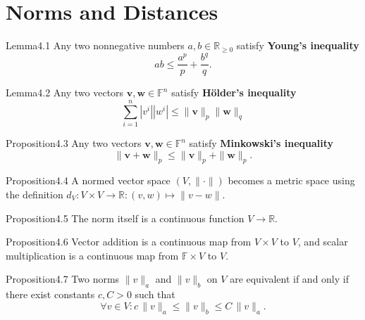 \section{Norms and Distances}

\begin{res}{Lemma}{4.1}
Any two nonnegative numbers $a,b\in\mathbb R_{\ge0}$ satisfy \textbf{Young's inequality}
\begin{equation}ab\le\frac{a^p}{p}+\frac{b^q}{q}.\tag{4.4}\end{equation}
\end{res}

\begin{res}{Lemma}{4.2}
Any two vectors $\boldsymbol v,\boldsymbol w\in\mathbb F^n$ satisfy \textbf{H\"older's inequality}
\begin{equation}\sum_{i=1}^n\left|v^i\right|\left|w^i\right|\le\|\boldsymbol v\|_p\|\boldsymbol w\|_q\tag{4.5}\end{equation}
\end{res}

\begin{res}{Proposition}{4.3}
Any two vectors $\boldsymbol v,\boldsymbol w\in\mathbb F^n$ satisfy \textbf{Minkowski's inequality}
\begin{equation}\|\boldsymbol v+\boldsymbol w\|_p\le\|\boldsymbol v\|_p+\|\boldsymbol w\|_p.\tag{4.6}\end{equation}
\end{res}

\begin{res}{Proposition}{4.4}
A normed vector space $(V,\|\cdot\|)$ becomes a metric space using the definition $d_V:V\times V\to\mathbb R:(v,w)\mapsto\|v-w\|$.
\end{res}

\begin{res}{Proposition}{4.5}
The norm itself is a continuous function $V\to\mathbb R$.
\end{res}

\begin{res}{Proposition}{4.6}
Vector addition is a continuous map from $V\times V$ to $V$, and scalar multiplication is a continuous map from $\mathbb F\times V$ to $V$.
\end{res}

\begin{res}{Proposition}{4.7}
Two norms $\|v\|_a$ and $\|v\|_b$ on $V$ are equivalent if and only if there exist constants $c,C>0$ such that
\begin{equation}\forall v\in V:c\,\|v\|_a\le\|v\|_b\le C\,\|v\|_a.\tag{4.10}\end{equation}
\end{res}

